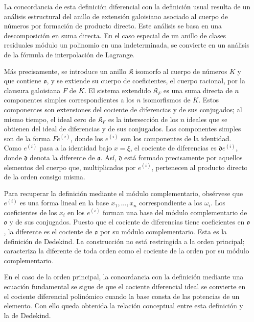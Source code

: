 \documentclass[11pt]{article}
\begin{document}
La concordancia de esta definición diferencial con la definición usual resulta de un análisis estructural del anillo de extensión galoisiano asociado al cuerpo de números por formación de producto directo. Este análisis se basa en una descomposición en suma directa. En el caso especial de un anillo de clases residuales módulo un polinomio en una indeterminada, se convierte en un análisis de la fórmula de interpolación de Lagrange.

Más precisamente, se introduce un anillo $\mathfrak K$ isomorfo al cuerpo de números $K$ y que contiene $\mathfrak o$, y se extiende su cuerpo de coeficientes, el cuerpo racional, por la clausura galoisiana $F$ de $K$. El sistema extendido $\mathfrak K_F$ es una suma directa de $n$ componentes simples correspondientes a los $n$ isomorfismos de $K$. Estos componentes son extensiones del cociente de diferencias y de sus conjugados; al mismo tiempo, el ideal cero de $\mathfrak K_F$ es la intersección de los $n$ ideales que se obtienen del ideal de diferencias y de sus conjugados. Los componentes simples son de la forma $Fe^{(i)}$, donde los $e^{(i)}$ son los componentes de la identidad. Como $e^{(i)}$ pasa a la identidad bajo $x=\xi$, el cociente de diferencias es $\mathfrak d e^{(i)}$, donde $\mathfrak d$ denota la diferente de $\mathfrak o$. Así, $\mathfrak d$ está formado precisamente por aquellos elementos del cuerpo que, multiplicados por $e^{(i)}$, pertenecen al producto directo de la orden consigo misma.

Para recuperar la definición mediante el módulo complementario, obsérvese que $e^{(i)}$ es una forma lineal en la base $x_1,\ldots,x_n$ correspondiente a los $\omega_i$. Los coeficientes de los $x_i$ en los $e^{(i)}$ forman una base del módulo complementario de $\mathfrak o$ y de sus conjugados. Puesto que el cociente de diferencias tiene coeficientes en $\mathfrak o$, la diferente es el cociente de $\mathfrak o$ por su módulo complementario. Esta es la definición de Dedekind. La construcción no está restringida a la orden principal; caracteriza la diferente de toda orden como el cociente de la orden por su módulo complementario.

En el caso de la orden principal, la concordancia con la definición mediante una ecuación fundamental se sigue de que el cociente diferencial ideal se convierte en el cociente diferencial polinómico cuando la base consta de las potencias de un elemento. Con ello queda obtenida la relación conceptual entre esta definición y la de Dedekind.
\end{document}
